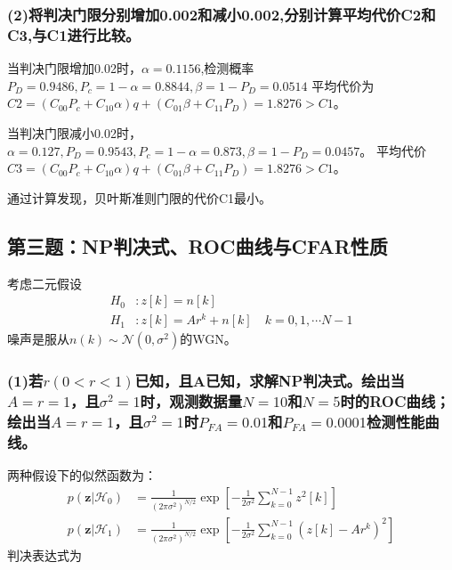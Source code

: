 \documentclass[fontset=windows]{article}
\numberwithin{figure}{section}
\begin{document}
\subsubsection*{(2)将判决门限分别增加0.002和减小0.002,分别计算平均代价C2和C3,与C1进行比较。}
当判决门限增加0.02时，\(\alpha=0.1156\),检测概率\(P_D=0.9486,P_c=1-\alpha=0.8844,\beta=1-P_D=0.0514\)
平均代价为\(C2=(C_{00}P_c+C_{10}\alpha)q+(C_{01}\beta+C_{11}P_D)=1.8276>C1\)。

当判决门限减小0.02时，\(\alpha=0.127,P_D=0.9543,P_c=1-\alpha=0.873,\beta=1-P_D=0.0457\)。
平均代价\(C3=(C_{00}P_c+C_{10}\alpha)q+(C_01\beta+C_{11}P_D)=1.8276>C1\)。

通过计算发现，贝叶斯准则门限的代价C1最小。

\subsection{第三题：NP判决式、ROC曲线与CFAR性质}
考虑二元假设
\begin{align*}
	H_0 & :z[k]=n[k]                            \\
	H_1 & :z[k]=Ar^k+n[k]\quad k=0,1,\cdots N-1
\end{align*}
噪声是服从\(n(k)\sim \mathcal{N}(0,\sigma^2)\)的WGN。

\subsubsection*{(1)若\(r(0<r<1)\)已知，且A已知，求解NP判决式。绘出当\(A=r=1\)，且\(\sigma^2=1\)时，观测数据量\(N=10\)和\(N=5\)时的ROC曲线；绘出当\(A=r=1\)，且\(\sigma^2=1\)时\(P_{FA}=0.01\)和\(P_{FA}=0.0001\)检测性能曲线。}

两种假设下的似然函数为：
\begin{align*}
	p(\mathbf{z}|\mathcal{H}_0) & =\frac{1}{(2\pi \sigma^2)^{N/2}}
	\exp\left[-\frac{1}{2\sigma^2}\sum_{k=0}^{N-1}z^2[k]\right]    \\
	p(\mathbf{z}|\mathcal{H}_1) & =\frac{1}{(2\pi \sigma^2)^{N/2}}
	\exp\left[-\frac{1}{2\sigma^2}\sum_{k=0}^{N-1}(z[k]-Ar^k)^2\right]
\end{align*}
判决表达式为
\end{document}
